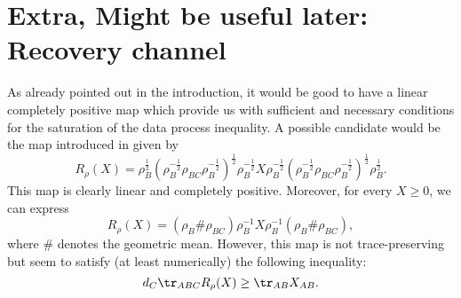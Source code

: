 

\section{Extra, Might be useful later: Recovery channel}

As already pointed out in the introduction, it would be good to have a linear completely positive map which provide us with sufficient and necessary conditions for the saturation of the data process inequality. A possible candidate would be the map introduced in   \cite{gondolf2024conditional} given by
\begin{equation}\label{eq:MapR}
    R_{\rho}(X)=\rho_B^{\frac{1}{2}}(\rho_B^{-\frac{1}{2}}\rho_{BC}\rho_B^{-\frac{1}{2}})^{\frac{1}{2}}\rho_B^{-\frac{1}{2}}X\rho_B^{-\frac{1}{2}}(\rho_B^{-\frac{1}{2}}\rho_{BC}\rho_B^{-\frac{1}{2}})^{\frac{1}{2}}\rho_B^{\frac{1}{2}}.
\end{equation}
This map is clearly linear and completely positive. Moreover, for every $X\geq 0$, we can express
\begin{equation}
    R_{\rho}(X)=(\rho_B \# \rho_{BC})\rho_B^{-1}X\rho_B^{-1}(\rho_B \# \rho_{BC}),
\end{equation}
where $\#$ denotes the geometric mean. However,  this map is not trace-preserving but seem to satisfy (at least numerically) the following inequality:
\begin{equation}
    d_C \tr_{ABC}R_{\rho}(X)\geq \tr_{AB}X_{AB}.
\end{equation}

